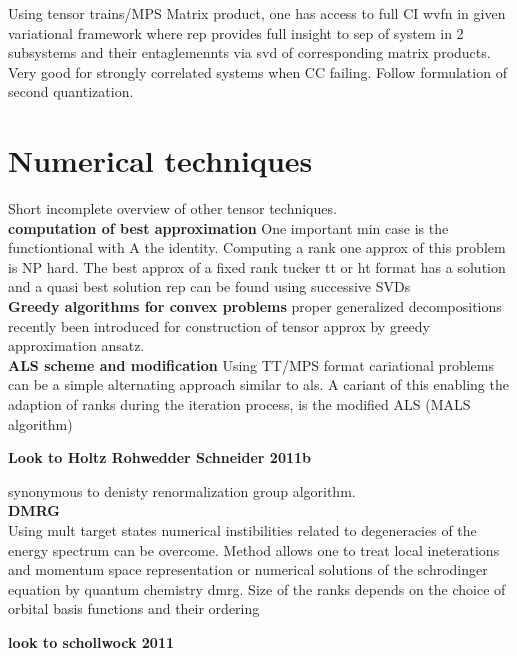 \documentclass[10pt, draft]{article}
\begin{document}
Using tensor trains/MPS Matrix product, one has access to full CI wvfn in given variational framework where rep provides full insight to sep of system in 2 subsystems and their entaglemennts via svd of corresponding matrix products.  Very good for strongly correlated systems when CC failing.  Follow formulation of second quantization.

\section{Numerical techniques}
Short incomplete overview of other tensor techniques.  \\
\textbf{computation of best approximation}  One important min case is the functiontional with A the identity.  Computing a rank one approx of this problem is NP hard.  The best approx of a fixed rank tucker tt or ht format has a solution and a quasi best solution rep can be found using successive SVDs\\
\textbf{Greedy algorithms for convex problems} proper generalized decompositions recently been introduced for construction of tensor approx by greedy approximation ansatz. \\
\textbf{ALS scheme and modification}  Using TT/MPS format cariational problems can be a simple alternating approach similar to als.  A cariant of this enabling the adaption of ranks during the iteration process, is the modified ALS (MALS algorithm)\linebreak[1]

\textbf{Look to Holtz Rohwedder Schneider 2011b}\linebreak[1]

synonymous to denisty renormalization group algorithm.  \\

\textbf{DMRG}\\
Using mult target states numerical instibilities related to degeneracies of the energy spectrum can be overcome. Method allows one to treat local ineterations and momentum space representation or numerical solutions of the schrodinger equation by quantum chemistry dmrg.  Size of the ranks depends on the choice of orbital basis functions and their ordering\linebreak[1]

\textbf{look to schollwock 2011}
\end{document}
